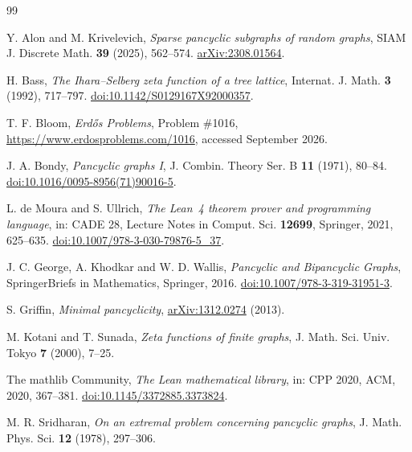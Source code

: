 \documentclass[11pt,a4paper]{article}
\numberwithin{equation}{section}
\theoremstyle{definition}
\theoremstyle{remark}
\begin{document}
\begin{thebibliography}{99}
\small

Y. Alon and M. Krivelevich,
\emph{Sparse pancyclic subgraphs of random graphs},
SIAM J. Discrete Math. \textbf{39} (2025), 562--574.
\href{https://arxiv.org/abs/2308.01564}{arXiv:2308.01564}.

H. Bass,
\emph{The Ihara--Selberg zeta function of a tree lattice},
Internat. J. Math. \textbf{3} (1992), 717--797.
\href{https://doi.org/10.1142/S0129167X92000357}{doi:10.1142/S0129167X92000357}.

T. F. Bloom,
\emph{Erd\H{o}s Problems}, Problem \#1016,
\url{https://www.erdosproblems.com/1016}, accessed September 2026.

J. A. Bondy,
\emph{Pancyclic graphs I},
J. Combin. Theory Ser. B \textbf{11} (1971), 80--84.
\href{https://doi.org/10.1016/0095-8956(71)90016-5}{doi:10.1016/0095-8956(71)90016-5}.

L. de Moura and S. Ullrich,
\emph{The Lean~4 theorem prover and programming language},
in: CADE 28, Lecture Notes in Comput. Sci. \textbf{12699}, Springer, 2021, 625--635.
\href{https://doi.org/10.1007/978-3-030-79876-5_37}{doi:10.1007/978-3-030-79876-5\_37}.

J. C. George, A. Khodkar and W. D. Wallis,
\emph{Pancyclic and Bipancyclic Graphs},
SpringerBriefs in Mathematics, Springer, 2016.
\href{https://doi.org/10.1007/978-3-319-31951-3}{doi:10.1007/978-3-319-31951-3}.

S. Griffin,
\emph{Minimal pancyclicity},
\href{https://arxiv.org/abs/1312.0274}{arXiv:1312.0274} (2013).

M. Kotani and T. Sunada,
\emph{Zeta functions of finite graphs},
J. Math. Sci. Univ. Tokyo \textbf{7} (2000), 7--25.

The mathlib Community,
\emph{The Lean mathematical library},
in: CPP 2020, ACM, 2020, 367--381.
\href{https://doi.org/10.1145/3372885.3373824}{doi:10.1145/3372885.3373824}.

M. R. Sridharan,
\emph{On an extremal problem concerning pancyclic graphs},
J. Math. Phys. Sci. \textbf{12} (1978), 297--306.

\end{thebibliography}
\end{document}
